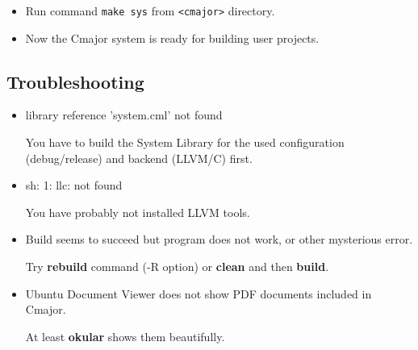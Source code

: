 \documentclass[oneside, a4paper, 11pt]{article}
\begin{document}
\begin{itemize}

\item
Run command \verb|make sys| from \verb|<cmajor>| directory.

\item
Now the Cmajor system is ready for building user projects.

\end{itemize}

\subsection{Troubleshooting}

\begin{itemize}

\item
library reference 'system.cml' not found

You have to build the System Library for the used configuration (debug/release) and backend (LLVM/C) first.

\item
sh: 1: llc: not found

You have probably not installed LLVM tools.

\item
Build seems to succeed but program does not work, or other mysterious error.

Try \textbf{rebuild} command (-R option) or \textbf{clean} and then \textbf{build}.

\item
Ubuntu Document Viewer does not show PDF documents included in Cmajor.

At least \textbf{okular} shows them beautifully.

\end{itemize}
\end{document}
